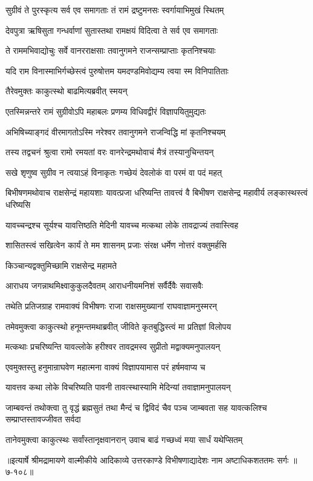 \twolineshloka
{सुग्रीवं ते पुरस्कृत्य सर्व एव समागताः}
{तं रामं द्रष्टुमनसः स्वर्गायाभिमुखं स्थितम्} %

\twolineshloka
{देवपुत्रा ऋषिसुता गन्धर्वाणां सुतास्तथा}
{रामक्षयं विदित्वा ते सर्व एव समागताः} %

\twolineshloka
{ते राममभिवाद्योचुः सर्वे वानरराक्षसाः}
{तवानुगमने राजन्सम्प्राप्ताः कृतनिश्चयाः} %

\twolineshloka
{यदि राम विनास्माभिर्गच्छेस्त्वं पुरुषोत्तम}
{यमदण्डमिवोद्यम्य त्वया स्म विनिपातिताः} %

\onelineshloka
{तैरेवमुक्तः काकुत्स्थो बाढमित्यब्रवीत् स्मयन्} %

\twolineshloka
{एतस्मिन्नन्तरे रामं सुग्रीवोऽपि महाबलः}
{प्रणम्य विधिवद्वीरं विज्ञापयितुमुद्यतः} %

\twolineshloka
{अभिषिच्याङ्गदं वीरमागतोऽस्मि नरेश्वर}
{तवानुगमने राजन्विद्धि मां कृतनिश्चयम्} %

\twolineshloka
{तस्य तद्वचनं श्रुत्वा रामो रमयतां वरः}
{वानरेन्द्रमथोवाचं मैत्रं तस्यानुचिन्तयन्} %

\twolineshloka
{सखे शृणुष्व सुग्रीव न त्वयाऽहं विनाकृतः}
{गच्छेयं देवलोकं वा परमं वा पदं महत्} %

\threelineshloka
{बिभीषणमथोवाच राक्षसेन्द्रं महायशाः}
{यावत्प्रजा धरिष्यन्ति तावत्त्वं वै बिभीषण}
{राक्षसेन्द्र महावीर्य लङ्कास्थस्त्वं धरिष्यसि} %

\twolineshloka
{यावच्चन्द्रश्च सूर्यश्च यावत्तिष्ठति मेदिनी}
{यावच्च मत्कथा लोके तावद्राज्यं तवास्त्विह} %

\twolineshloka
{शासितस्त्वं सखित्वेन कार्यं ते मम शासनम्}
{प्रजाः संरक्ष धर्मेण नोत्तरं वक्तुमर्हसि} %

\onelineshloka
{किञ्चान्यद्वक्तुमिच्छामि राक्षसेन्द्र महामते} %

\twolineshloka
{आराधय जगन्नाथमिक्ष्वाकुकुलदैवतम्}
{आराधनीयमनिशं सर्वैर्दैवैः सवासवैः} %

\twolineshloka
{तथेति प्रतिजग्राह रामवाक्यं विभीषणः}
{राजा राक्षसमुख्यानां राघवाज्ञामनुस्मरन्} %

\twolineshloka
{तमेवमुक्त्वा काकुत्स्थो हनूमन्तमथाब्रवीत्}
{जीविते कृतबुद्धिस्त्वं मा प्रतिज्ञां विलोपय} %

\twolineshloka
{मत्कथाः प्रचरिष्यन्ति यावल्लोके हरीश्वर}
{तावद्रमस्व सुप्रीतो मद्वाक्यमनुपालयन्} %

\twolineshloka
{एवमुक्तस्तु हनुमान्राघवेण महात्मना}
{वाक्यं विज्ञापयामास परं हर्षमवाप्य च} %

\twolineshloka
{यावत्तव कथा लोके विचरिष्यति पावनी}
{तावत्स्थास्यामि मेदिन्यां तवाज्ञामनुपालयन्} %

\threelineshloka
{जाम्बवन्तं तथोक्त्वा तु वृद्धं ब्रह्मसुतं तथा}
{मैन्दं च द्विविदं चैव पञ्च जाम्बवता सह}
{यावत्कलिश्च सम्प्राप्तस्तावज्जीवत सर्वदा} %

\twolineshloka
{तानेवमुक्त्वा काकुत्स्थः सर्वांस्तानृक्षवानरान्}
{उवाच बाढं गच्छध्वं मया सार्धं यथेप्सितम्} %


॥इत्यार्षे श्रीमद्रामायणे वाल्मीकीये आदिकाव्ये उत्तरकाण्डे विभीषणाद्यादेशः नाम अष्टाधिकशततमः सर्गः ॥७-१०८॥
